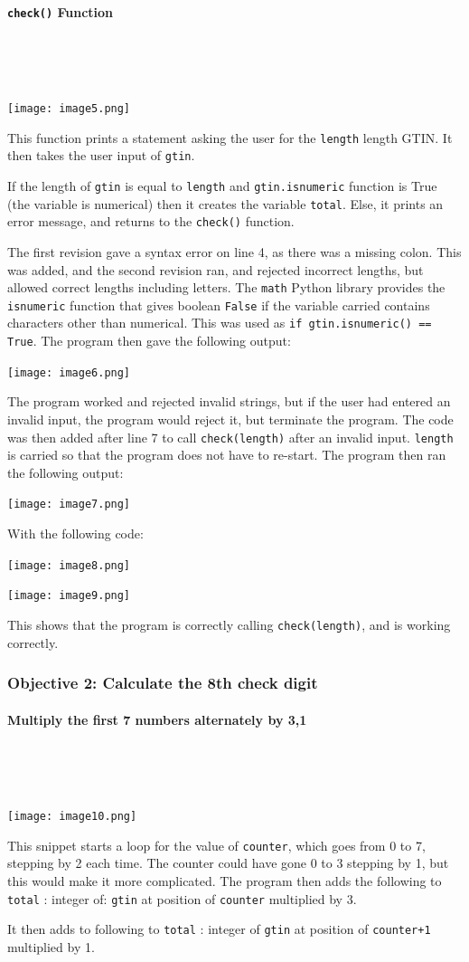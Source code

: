 \documentclass[a4paper]{article}
\begin{document}
\paragraph{\texttt{check()} Function} ~ \par ~ \par
\noindent\texttt{[image: image5.png]} \par
This function prints a statement asking the user for the \verb|length| length GTIN. It then takes the user input of \verb|gtin|. \par
If the length of \verb|gtin| is equal to \verb|length| and \verb|gtin.isnumeric| function is True (the variable is numerical) then it creates the variable \verb|total|. Else, it prints an error message, and returns to the \verb|check()| function. \par
The first revision gave a syntax error on line 4, as there was a missing colon. This was added, and the second revision ran, and rejected incorrect lengths, but allowed correct lengths including letters. The \verb|math| Python library provides the \verb|isnumeric| function that gives boolean \verb|False| if the variable carried contains characters other than numerical. This was used as \verb|if gtin.isnumeric() == True|. The program then gave the following output: \par
\noindent\texttt{[image: image6.png]} \par
The program worked and rejected invalid strings, but if the user had entered an invalid input, the program would reject it, but terminate the program. The code was then added after line 7 to call \verb|check(length)| after an invalid input. \verb|length| is carried so that the program does not have to re-start. The program then ran the following output: \par
\noindent\texttt{[image: image7.png]} \par
With the following code: \par
\noindent\texttt{[image: image8.png]} ~ \par
\noindent\texttt{[image: image9.png]} ~\par
This shows that the program is correctly calling \verb|check(length)|, and is working correctly.
\newpage
\subsubsection{Objective 2: Calculate the 8th check digit}
\paragraph{Multiply the first 7 numbers alternately by 3,1} ~ \par ~ \par
\noindent\texttt{[image: image10.png]} ~\par
This snippet starts a loop for the value of \verb|counter|, which goes from 0 to 7, stepping by 2 each time. The counter could have gone 0 to 3 stepping by 1, but this would make it more complicated. The program then adds the following to \verb|total| : integer of: \verb|gtin| at position of \verb|counter| multiplied by 3. \par
\noindent It then adds to following to \verb|total| : integer of \verb|gtin| at position of \verb|counter+1| multiplied by 1.
\end{document}
